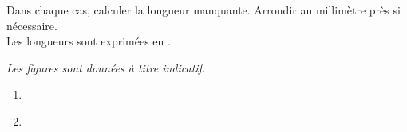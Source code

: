     Dans chaque cas, calculer la longueur manquante. Arrondir au millimètre près si nécessaire.\\
    Les longueurs sont exprimées en \Lg{}.

    {\it Les figures sont données à titre indicatif.}

    \begin{enumerate}
        \item \phantom{rrr}\\

        {\red {}}
        \item \phantom{rrr}\\

        {\red {}}
    \end{enumerate}

